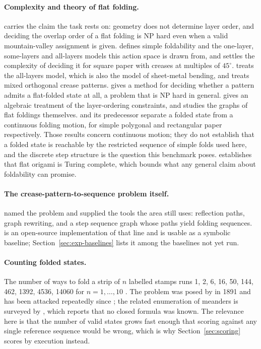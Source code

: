 \paragraph{Complexity and theory of flat folding.}
\citet{bern-hayes} carries the claim the task rests on: geometry does not determine layer order,
and deciding the overlap order of a flat folding is NP hard even when a valid mountain-valley
assignment is given. \citet{arkin-map} defines simple foldability and the one-layer, some-layers
and all-layers models this action space is drawn from, and \citet{akitaya-hard} settles the
complexity of deciding it for square paper with creases at multiples of $45^\circ$.
\citet{akitaya-infinite} treats the all-layers model, which is also the model of sheet-metal
bending, and \citet{mixed-orthogonal} treats mixed orthogonal crease patterns.
\citet{akitaya-flatfolder} gives a method for deciding whether a pattern admits a flat-folded
state at all, a problem that is NP hard in general. \citet{layer-algebra} gives an algebraic
treatment of the layer-ordering constraints, and \citet{flat-folding-graphs} studies the graphs of
flat foldings themselves. \citet{continuous} and its predecessor \citet{reaching-folded} separate a
folded state from a continuous folding motion, for simple polygonal and rectangular paper
respectively. Those results concern continuous motion; they do not establish that a folded state
is reachable by the restricted sequence of simple folds used here, and the discrete step structure
is the question this benchmark poses. \citet{turing} establishes that flat origami is Turing
complete, which bounds what any general claim about foldability can promise.

\paragraph{The crease-pattern-to-sequence problem itself.}
\citet{akitaya-cp2seq} named the problem and supplied the tools the area still uses: reflection
paths, graph rewriting, and a step sequence graph whose paths yield folding sequences.
\citet{creasy} is an open-source implementation of that line and is usable as a symbolic baseline;
Section~\ref{sec:exp-baselines} lists it among the baselines not yet run.

\paragraph{Counting folded states.}
The number of ways to fold a strip of $n$ labelled stamps runs 1, 2, 6, 16, 50, 144, 462, 1392,
4536, 14060 for $n=1,\ldots,10$ \citep{oeis-a000136}. The problem was posed by \citet{lucas} in
1891 and has been attacked repeatedly since \citep{koehler,lunnon}; the related enumeration of
meanders is surveyed by \citet{meanders}, which reports that no closed formula was known. The
relevance here is that the number of valid states grows fast enough that scoring against any
single reference sequence would be wrong, which is why Section~\ref{sec:scoring} scores by
execution instead.


